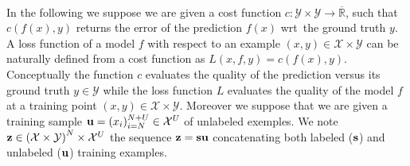 \paragraph{}
In the following we suppose we are given a cost function
$c:\mathcal{Y}\times\mathcal{Y}\to\overline{\mathbb{R}}$, such that $c(f(x),y)$
returns the error of the prediction $f(x)$ \acs{wrt}~the ground truth $y$. A
loss function of a model $f$ with respect to an example
$(x,y)\in\mathcal{X}\times\mathcal{Y}$ can be naturally defined from a cost
function as $L(x,f,y)=c(f(x),y)$. Conceptually the function $c$ evaluates the
quality of the prediction versus its ground truth $y\in\mathcal{Y}$ while the
loss function $L$ evaluates the quality of the model $f$ at a training point
$(x,y)\in\mathcal{X}\times\mathcal{Y}$. Moreover we suppose that we are given a
training sample $\boldsymbol{\mathbf{u}}=(x_i)_{i=N}^{N+U}\in\mathcal{X}^U$ of unlabeled
exemples. We note
$\boldsymbol{\mathbf{z}}\in\left(\mathcal{X}\times\mathcal{Y}\right)^N\times\mathcal{X}^U$ the
sequence $\boldsymbol{\mathbf{z}}=\boldsymbol{\mathbf{s}}\boldsymbol{\mathbf{u}}$ concatenating both labeled ($\boldsymbol{\mathbf{s}}$) and
unlabeled ($\boldsymbol{\mathbf{u}}$) training examples.
